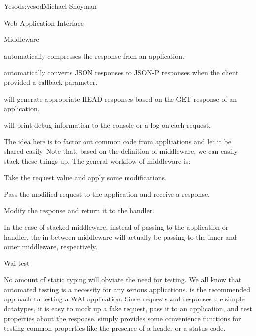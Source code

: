 \begin{aosachapter}{Yesod}{s:yesod}{Michael Snoyman}
\begin{aosasect1}{Web Application Interface}
\begin{aosasect2}{Middleware}
\begin{aosaitemize}

\item {} automatically compresses the response from an
  application.

\item {} automatically converts JSON responses to JSON-P
  responses when the client provided a callback parameter.

\item {} will generate appropriate HEAD responses based
  on the GET response of an application.

\item {} will print debug information to the console or a
  log on each request.

\end{aosaitemize}

The idea here is to factor out common code from applications and let
it be shared easily. Note that, based on the definition of 
middleware, we can easily stack these things up. The general workflow
of middleware is:

\begin{aosaenumerate}

\item Take the request value and apply some modifications.

\item Pass the modified request to the application and receive a
  response.

\item Modify the response and return it to the handler.

\end{aosaenumerate}

In the case of stacked middleware, instead of passing to the
application or handler, the in-between middleware will actually be passing to the
inner and outer middleware, respectively.

\end{aosasect2}

\begin{aosasect2}{Wai-test}

No amount of static typing will obviate the need for testing. We all
know that automated testing is a necessity for any serious
applications.  is the recommended approach to testing a
WAI application. Since requests and responses are simple datatypes, it
is easy to mock up a fake request, pass it to an application, and test
properties about the response.  simply provides some
convenience functions for testing common properties like the presence
of a header or a status code.


\end{aosasect2}
\end{aosasect1}
\end{aosachapter}
